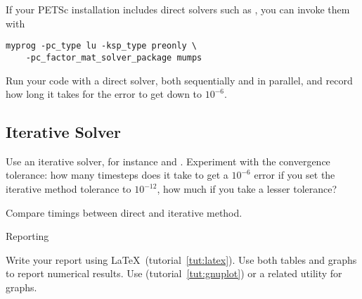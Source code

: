 If your PETSc installation includes direct solvers such as
, you can invoke them with
\begin{verbatim}
myprog -pc_type lu -ksp_type preonly \
    -pc_factor_mat_solver_package mumps 
\end{verbatim}
Run your code with a direct solver, both sequentially and in parallel,
and record how long it takes for the error to get down to $10^{-6}$.

\subsection*{Iterative Solver}

Use an iterative solver, for instance  and .
Experiment with the convergence tolerance: how many timesteps does it
take to get a $10^{-6}$ error if you set the iterative method
tolerance to $10^{-12}$, how much if you take a lesser tolerance?

Compare timings between direct and iterative method.

 {Reporting}

Write your report using \LaTeX\ (tutorial~\ref{tut:latex}). Use both
tables and graphs to report numerical results. Use \n{gnuplot}
(tutorial~\ref{tut:gnuplot}) or a related utility for graphs.

